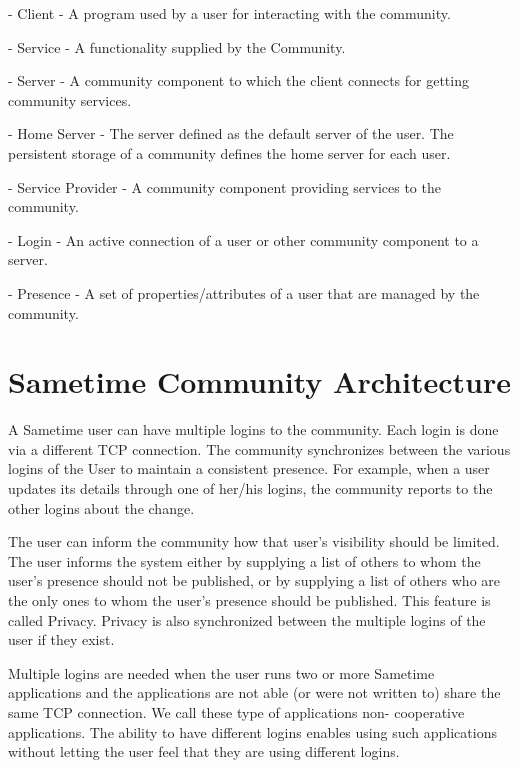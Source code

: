 \documentclass[titlepage,oneside]{book}
\begin{document}
\par{} - Client - A program used by a user for interacting with the
community.

\par{} - Service - A functionality supplied by the Community.

\par{} - Server - A community component to which the client connects
for getting community services.

\par{} - Home Server - The server defined as the default server of the
user.  The persistent storage of a community defines the home server
for each user.

\par{} - Service Provider - A community component providing services
to the community.

\par{} - Login - An active connection of a user or other community
component to a server.

\par{} - Presence - A set of properties/attributes of a user that are
managed by the community.

\section{Sametime Community Architecture}

\par{} A Sametime user can have multiple logins to the community. Each
login is done via a different TCP connection. The community
synchronizes between the various logins of the User to maintain a
consistent presence. For example, when a user updates its details
through one of her/his logins, the community reports to the other
logins about the change.

\par{} The user can inform the community how that user's visibility
should be limited. The user informs the system either by supplying a
list of others to whom the user's presence should not be published, or
by supplying a list of others who are the only ones to whom the user's
presence should be published. This feature is called Privacy. Privacy
is also synchronized between the multiple logins of the user if they
exist.

\par{} Multiple logins are needed when the user runs two or more
Sametime applications and the applications are not able (or were not
written to) share the same TCP connection. We call these type of
applications non- cooperative applications. The ability to have
different logins enables using such applications without letting the
user feel that they are using different logins.
\end{document}
